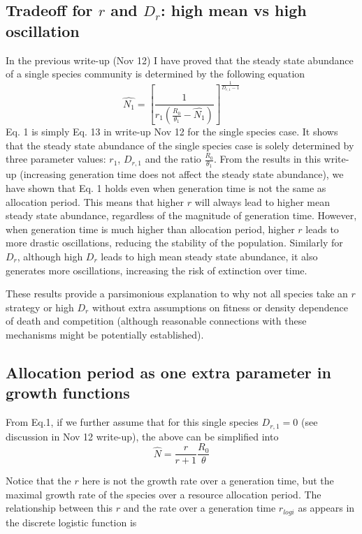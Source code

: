 \documentclass[12pt]{article}
\begin{document}
\subsection{Tradeoff for $r$ and $D_r$: high mean vs high oscillation}
In the previous write-up (Nov 12) I have proved that the steady state abundance of a single species community is determined by the following equation
  \begin{equation}
\hat{N_1} =[ \frac{1}{r_1 (\frac{R_0}{\theta_1}- \hat{N_1})}]^{\frac{1}{D_{r,1}-1}}
  \end{equation}
Eq. 1 is simply Eq. 13 in write-up Nov 12 for the single species case. It shows that the steady state abundance of the single species case is solely determined by three parameter values: $r_1$, $D_{r,1}$ and the ratio $\frac{R_0}{\theta_1}$. From the results in this write-up (increasing generation time does not affect the steady state abundance), we have shown that Eq. 1 holds even when generation time is not the same as allocation period. This means that higher $r$ will always lead to higher mean steady state abundance, regardless of the magnitude of generation time. However, when generation time is much higher than allocation period,  higher $r$ leads to more drastic oscillations, reducing the stability of the population. Similarly for $D_r$, although high $D_r$ leads to high mean steady state abundance, it also generates more oscillations, increasing the risk of extinction over time.

These results provide a parsimonious explanation to why not all species take an $r$ strategy or high $D_r$ without extra assumptions on fitness or density dependence of death and competition (although reasonable connections with these mechanisms might be potentially established).

\subsection{Allocation period as one extra parameter in growth functions}

From Eq.1, if we further assume that for this single species $D_{r,1}=0$ (see discussion in Nov 12 write-up), the above can be simplified into 
   \begin{equation}
\hat{N} = \frac{r}{r+1}\frac{ R_0}{\theta} 
  \end{equation}

Notice that the $r$ here is not the growth rate over a generation time, but the maximal growth rate of the species over a resource allocation period. The relationship between this $r$ and the rate over a generation time $r_{logi}$ as appears in the discrete logistic function is
\end{document}
